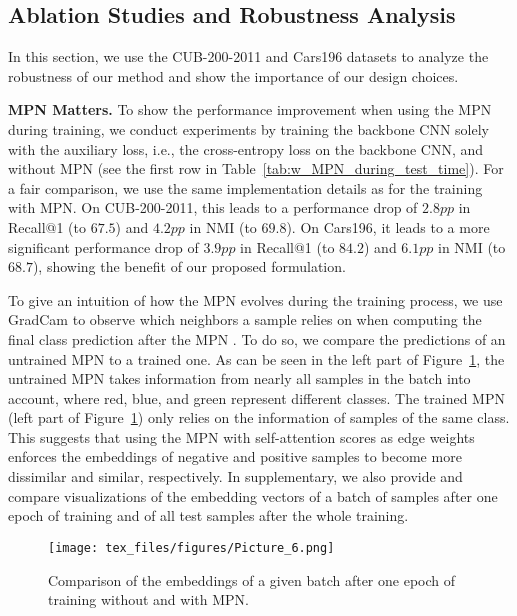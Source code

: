 \documentclass{article}
\begin{document}
\vspace{-0.2cm}
\subsection{Ablation Studies and Robustness Analysis}
\label{subsec:ablations}

In this section, we use the CUB-200-2011 \cite{WahCUB_200_2011} and Cars196 \cite{KrauseStarkDengFei-Fei_3DRR2013} datasets to analyze the robustness of our method and show the importance of our design choices.

\noindent\textbf{MPN Matters.} To show the performance improvement when using the MPN during training, we conduct experiments by training the backbone CNN solely with the auxiliary loss, i.e., the cross-entropy loss on the backbone CNN, and without MPN (see the first row in Table~\ref{tab:w_MPN_during_test_time}). For a fair comparison, we use the same implementation details as for the training with MPN. On CUB-200-2011, this leads to a performance drop of $2.8pp$ in Recall@1 (to $67.5$) and $4.2pp$ in NMI (to $69.8$). On Cars196, it leads to a more significant performance drop of $3.9pp$ in Recall@1 (to $84.2$) and $6.1pp$ in NMI (to $68.7$), showing the benefit of our proposed formulation. 

To give an intuition of how the MPN evolves during the training process, we use GradCam \cite{DBLP:journals/ijcv/SelvarajuCDVPB20} to observe which neighbors a sample relies on when computing the final class prediction after the MPN \cite{DBLP:journals/ijcv/SelvarajuCDVPB20}. To do so, we compare the predictions of an untrained MPN to a trained one. As can be seen in the left part of Figure~\ref{fig:trained_untrained}, the untrained MPN takes information from nearly all samples in the batch into account, where red, blue, and green represent different classes. The trained MPN (left part of Figure~\ref{fig:trained_untrained}) only relies on the information of samples of the same class. This suggests that using the MPN with self-attention scores as edge weights enforces the embeddings of negative and positive samples to become more dissimilar and similar, respectively. In supplementary, we also provide and compare visualizations of the embedding vectors of a batch of samples after one epoch of training and of all test samples after the whole training.

\begin{figure}
    \centering
    \texttt{[image: tex\_files/figures/Picture\_6.png]}
    \caption{Comparison of the embeddings of a given batch after one epoch of training without and with MPN.}
\label{fig:trained_untrained}
\end{figure}
\end{document}
